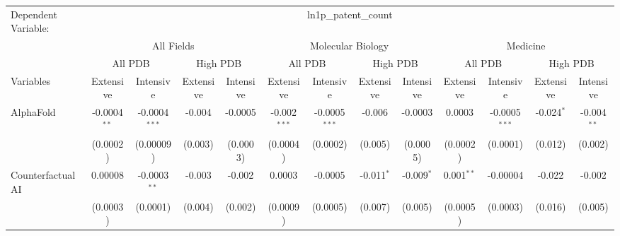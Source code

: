 \begingroup
\centering
\begin{tabular}{lcccccccccccc}
   \tabularnewline \midrule \midrule
   Dependent Variable: & \multicolumn{12}{c}{ln1p\_patent\_count}\\
 & \multicolumn{4}{c}{All Fields} & \multicolumn{4}{c}{Molecular Biology} & \multicolumn{4}{c}{Medicine} \\
\cmidrule(lr){2-5} \cmidrule(lr){6-9} \cmidrule(lr){10-13}
 & \multicolumn{2}{c}{All PDB} & \multicolumn{2}{c}{High PDB} & \multicolumn{2}{c}{All PDB} & \multicolumn{2}{c}{High PDB} & \multicolumn{2}{c}{All PDB} & \multicolumn{2}{c}{High PDB} \\
\cmidrule(lr){2-3} \cmidrule(lr){4-5} \cmidrule(lr){6-7} \cmidrule(lr){8-9} \cmidrule(lr){10-11} \cmidrule(lr){12-13}
Variables & \multicolumn{1}{c}{Extensive} & \multicolumn{1}{c}{Intensive} & \multicolumn{1}{c}{Extensive} & \multicolumn{1}{c}{Intensive} & \multicolumn{1}{c}{Extensive} & \multicolumn{1}{c}{Intensive} & \multicolumn{1}{c}{Extensive} & \multicolumn{1}{c}{Intensive} & \multicolumn{1}{c}{Extensive} & \multicolumn{1}{c}{Intensive} & \multicolumn{1}{c}{Extensive} & \multicolumn{1}{c}{Intensive} \\
\cmidrule(lr){1-1}\cmidrule(lr){2-2} \cmidrule(lr){3-3} \cmidrule(lr){4-4} \cmidrule(lr){5-5} \cmidrule(lr){6-6} \cmidrule(lr){7-7} \cmidrule(lr){8-8} \cmidrule(lr){9-9} \cmidrule(lr){10-10} \cmidrule(lr){11-11} \cmidrule(lr){12-12} \cmidrule(lr){13-13}
   AlphaFold                                & -0.0004$^{**}$ & -0.0004$^{***}$ & -0.004         & -0.0005        & -0.002$^{***}$ & -0.0005$^{***}$ & -0.006       & -0.0003         & 0.0003         & -0.0005$^{***}$  & -0.024$^{*}$   & -0.004$^{**}$\\   
                                            & (0.0002)       & (0.00009)       & (0.003)        & (0.0003)       & (0.0004)       & (0.0002)        & (0.005)      & (0.0005)        & (0.0002)       & (0.0001)         & (0.012)        & (0.002)\\   
   Counterfactual AI                        & 0.00008        & -0.0003$^{**}$  & -0.003         & -0.002         & 0.0003         & -0.0005         & -0.011$^{*}$ & -0.009$^{*}$    & 0.001$^{**}$   & -0.00004         & -0.022         & -0.002\\   
                                            & (0.0003)       & (0.0001)        & (0.004)        & (0.002)        & (0.0009)       & (0.0005)        & (0.007)      & (0.005)         & (0.0005)       & (0.0003)         & (0.016)        & (0.005)\\   

\end{tabular}
